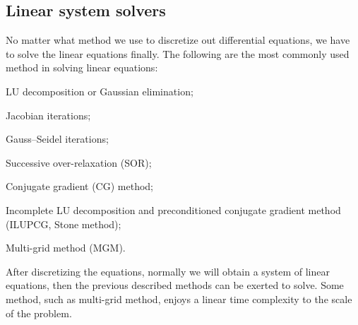 \documentclass[english, nochinese]{pkupaper}
\begin{document}
\subsection{Linear system solvers}

No matter what method we use to discretize out differential equations, we have to solve the linear equations finally.
The following are the most commonly used method in solving linear equations:
\begin{partlist}
\item LU decomposition or Gaussian elimination;
\item Jacobian iterations;
\item Gauss--Seidel iterations;
\item Successive over-relaxation (SOR);
\item Conjugate gradient (CG) method;
\item Incomplete LU decomposition and preconditioned conjugate gradient method (ILUPCG, Stone method);
\item Multi-grid method (MGM).
\end{partlist}

After discretizing the equations, normally we will obtain a system of linear equations, then the previous described methods can be exerted to solve. Some method, such as multi-grid method, enjoys a linear time complexity to the scale of the problem.


\end{document}
